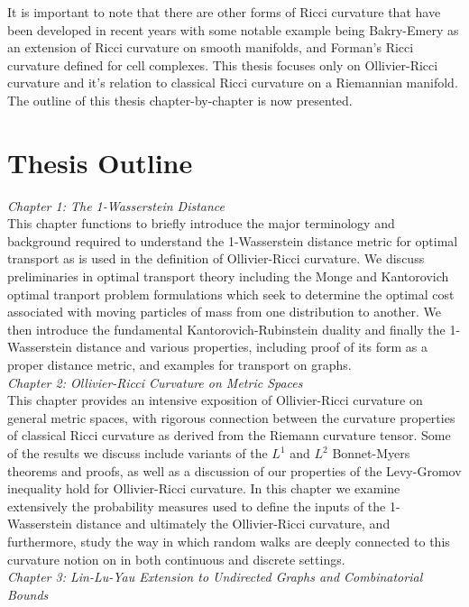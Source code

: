 \documentclass{Dissertate}
\theoremstyle{definition}
\theoremstyle{definition} %
\theoremstyle{definition}
\begin{document}
It is important to note that there are other forms of Ricci curvature that have been developed in recent years with some notable example being Bakry-Emery as an extension of Ricci curvature on smooth manifolds, and Forman's Ricci curvature defined for cell complexes. \cite{najman_modern_2017} This thesis focuses only on Ollivier-Ricci curvature and it's relation to classical Ricci curvature on a Riemannian manifold. The outline of this thesis chapter-by-chapter is now presented.

\section*{Thesis Outline}

\textit{Chapter 1: The 1-Wasserstein Distance}\\

This chapter functions to briefly introduce the major terminology and background required to understand the 1-Wasserstein distance metric for optimal transport as is used in the definition of Ollivier-Ricci curvature. We discuss preliminaries in optimal transport theory including the Monge and Kantorovich optimal tranport problem formulations which seek to determine the optimal cost associated with moving particles of mass from one distribution to another. We then introduce the fundamental Kantorovich-Rubinstein duality and finally the 1-Wasserstein distance and various properties, including proof of its form as a proper distance metric, and examples for transport on graphs. \\
\vspace{0.5cm}
\noindent
\textit{Chapter 2: Ollivier-Ricci Curvature on Metric Spaces}\\
This chapter provides an intensive exposition of Ollivier-Ricci curvature on general metric spaces,  with rigorous connection between the curvature properties of classical Ricci curvature as derived from the Riemann curvature tensor. Some of the results we discuss include variants of the $L^1$ and $L^2$ Bonnet-Myers theorems and proofs, as well as a discussion of our properties of the Levy-Gromov inequality hold for Ollivier-Ricci curvature. In this chapter we examine extensively the probability measures used to define the inputs of the 1-Wasserstein distance and ultimately the Ollivier-Ricci curvature, and furthermore, study the way in which random walks are deeply connected to this curvature notion on in both continuous and discrete settings.  
\\
\vspace{0.5cm}
\noindent
\textit{Chapter 3: Lin-Lu-Yau Extension to Undirected Graphs and Combinatorial Bounds}\\
\end{document}
